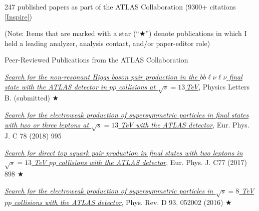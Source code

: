 \vspace{0.15in}
\hspace{0.25in}\begin{minipage}{0.8\textwidth}

247 published papers as part of the ATLAS Collaboration (9300+ citations \href{https://inspirehep.net/author/profile/D.J.Antrim.1}{[Inspire]})

\vspace{0.15in}
(Note: Items that are marked with a star (``$\bigstar$'') denote publications in which I held a leading analyzer, analysis contact, and/or paper-editor role)


\vspace{0.15in}
\hspace{0.2in}Peer-Reviewed Publications from the ATLAS Collaboration

\hspace{0.35in}\begin{minipage}{1.0\textwidth}

\vspace{0.15in}
\href{https://arxiv.org/abs/1908.06765}{\textit{Search for the non-resonant Higgs boson pair production in the $bb\ell\nu\ell\nu$ final state with the ATLAS detector in $pp$ collisions at $\sqrt{s} = 13$\,TeV}}, Physics Letters B. (submitted) $\bigstar$

\vspace{0.15in}
\href{https://arxiv.org/abs/1803.02762}{\textit{Search for the electroweak production of supersymmetric particles in final states with
two or three leptons at $\sqrt{s} = 13$ TeV with the ATLAS detector}}, Eur. Phys. J. C 78 (2018) 995

\vspace{0.15in}
\href{https://arxiv.org/abs/1708.03247}{\textit{Search for direct top squark pair production in final states with two leptons
in $\sqrt{s} = 13$ TeV $pp$ collisions with the ATLAS detector}}, Eur. Phys. J. C77 (2017) 898 $\bigstar$

\vspace{0.15in}
\href{https://arxiv.org/abs/1509.07152}{\textit{Search for the electroweak production of supersymmetric particles in
$\sqrt{s} = 8$ TeV $pp$ collisions with the ATLAS detector}}, Phys. Rev. D 93, 052002 (2016) $\bigstar$


\end{minipage}


\end{minipage}
